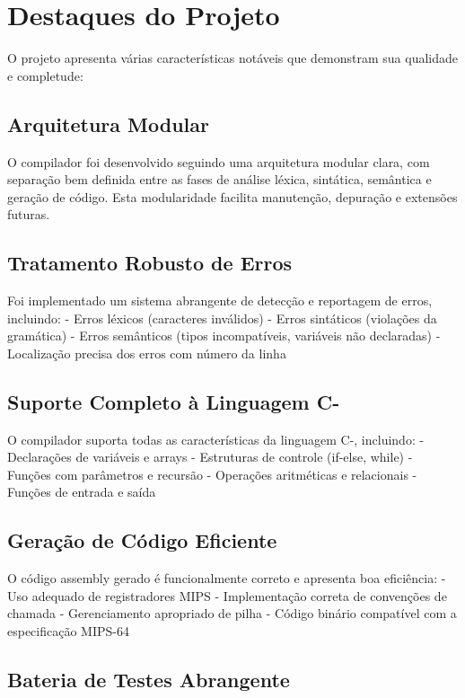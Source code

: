 \documentclass[
	12pt,				%
	oneside,
	a4paper,			%
	english,			%
	french,				%
	spanish,			%
	brazil,				%
	]{abntex2}
\begin{document}
\section{Destaques do Projeto}

O projeto apresenta várias características notáveis que demonstram sua qualidade e completude:

\subsection{Arquitetura Modular}

O compilador foi desenvolvido seguindo uma arquitetura modular clara, com separação bem definida entre as fases de análise léxica, sintática, semântica e geração de código. Esta modularidade facilita manutenção, depuração e extensões futuras.

\subsection{Tratamento Robusto de Erros}

Foi implementado um sistema abrangente de detecção e reportagem de erros, incluindo:
- Erros léxicos (caracteres inválidos)
- Erros sintáticos (violações da gramática)
- Erros semânticos (tipos incompatíveis, variáveis não declaradas)
- Localização precisa dos erros com número da linha

\subsection{Suporte Completo à Linguagem C-}

O compilador suporta todas as características da linguagem C-, incluindo:
- Declarações de variáveis e arrays
- Estruturas de controle (if-else, while)
- Funções com parâmetros e recursão
- Operações aritméticas e relacionais
- Funções de entrada e saída

\subsection{Geração de Código Eficiente}

O código assembly gerado é funcionalmente correto e apresenta boa eficiência:
- Uso adequado de registradores MIPS
- Implementação correta de convenções de chamada
- Gerenciamento apropriado de pilha
- Código binário compatível com a especificação MIPS-64

\subsection{Bateria de Testes Abrangente}
\end{document}
